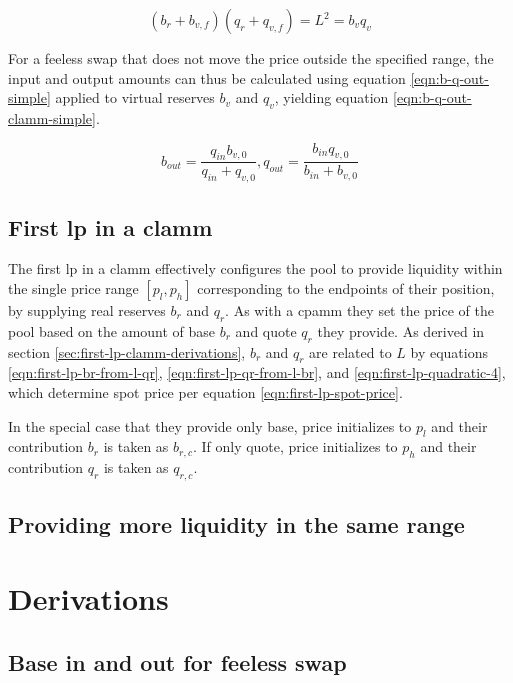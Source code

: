 \documentclass[table, twocolumn]{article}
\begin{document}
\begin{equation} \label{eqn:clamm-curve-translation}
  (b_r + b_{v, f})(q_r + q_{v, f}) = L^2 = b_v q_v
\end{equation}

For a feeless swap that does not move the price outside the specified range, the input
and output amounts can thus be calculated using equation \ref{eqn:b-q-out-simple}
applied to virtual reserves $b_v$ and $q_v$, yielding equation
\ref{eqn:b-q-out-clamm-simple}.

\begin{equation} \label{eqn:b-q-out-clamm-simple}
  b_{out} = \frac{q_{in} b_{v, 0}}{q_{in} + q_{v, 0}},
  q_{out} = \frac{b_{in} q_{v, 0}}{b_{in} + b_{v, 0}}
\end{equation}

\subsection{First \gls{lp} in a \gls{clamm}}

The first \gls{lp} in a \gls{clamm} effectively configures the pool to provide liquidity
within the single price range $[p_l, p_h]$ corresponding to the endpoints of their
position, by supplying real reserves $b_r$ and $q_r$. As with a \gls{cpamm} they set the
price of the pool based on the amount of base $b_r$ and quote $q_r$ they provide. As
derived in section \ref{sec:first-lp-clamm-derivations}, $b_r$ and $q_r$ are related to
$L$ by equations \ref{eqn:first-lp-br-from-l-qr}, \ref{eqn:first-lp-qr-from-l-br}, and
\ref{eqn:first-lp-quadratic-4}, which determine spot price per equation
\ref{eqn:first-lp-spot-price}.

In the special case that they provide only base, price initializes to $p_l$ and their
contribution $b_r$ is taken as $b_{r, c}$. If only quote, price initializes to $p_h$ and
their contribution $q_r$ is taken as $q_{r, c}$.

\subsection{Providing more liquidity in the same range}

\section{Derivations}

\subsection{Base in and out for feeless swap} \label{eqn:b-q-out-simple-derivation}
\end{document}
